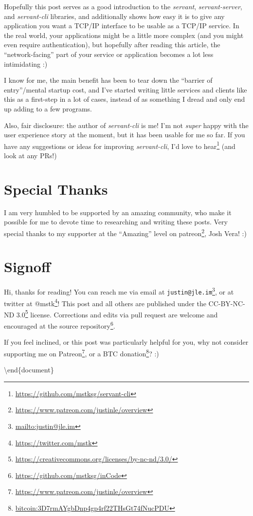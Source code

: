 \documentclass[]{article}
\renewcommand{\href}[2]{#2\footnote{\url{#1}}}
\begin{document}
Hopefully this post serves as a good introduction to the \emph{servant},
\emph{servant-server}, and \emph{servant-cli} libraries, and additionally shows
how easy it is to give any application you want a TCP/IP interface to be usable
as a TCP/IP service. In the real world, your applications might be a little more
complex (and you might even require authentication), but hopefully after reading
this article, the ``network-facing'' part of your service or application becomes
a lot less intimidating :)

I know for me, the main benefit has been to tear down the ``barrier of
entry''/mental startup cost, and I've started writing little services and
clients like this as a first-step in a lot of cases, instead of as something I
dread and only end up adding to a few programs.

Also, fair disclosure: the author of \emph{servant-cli} is me! I'm not
\emph{super} happy with the user experience story at the moment, but it has been
usable for me so far. If you have any suggestions or ideas for improving
\emph{servant-cli}, I'd \href{https://github.com/mstksg/servant-cli}{love to
hear} (and look at any PRs!)

\section{Special Thanks}\label{special-thanks}

I am very humbled to be supported by an amazing community, who make it possible
for me to devote time to researching and writing these posts. Very special
thanks to my supporter at the ``Amazing'' level on
\href{https://www.patreon.com/justinle/overview}{patreon}, Josh Vera! :)

\section{Signoff}\label{signoff}

Hi, thanks for reading! You can reach me via email at
\href{mailto:justin@jle.im}{\nolinkurl{justin@jle.im}}, or at twitter at
\href{https://twitter.com/mstk}{@mstk}! This post and all others are published
under the \href{https://creativecommons.org/licenses/by-nc-nd/3.0/}{CC-BY-NC-ND
3.0} license. Corrections and edits via pull request are welcome and encouraged
at \href{https://github.com/mstksg/inCode}{the source repository}.

If you feel inclined, or this post was particularly helpful for you, why not
consider \href{https://www.patreon.com/justinle/overview}{supporting me on
Patreon}, or a \href{bitcoin:3D7rmAYgbDnp4gp4rf22THsGt74fNucPDU}{BTC donation}?
:)

\textbackslash end\{document\}
\end{document}
